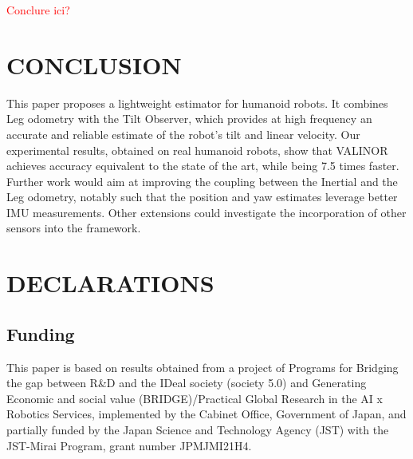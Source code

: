 \documentclass{IJCAS}
\begin{document}
\textcolor{red}{Conclure ici?}

\section{CONCLUSION}

This paper proposes a lightweight estimator for humanoid robots. It combines Leg odometry with the Tilt Observer, which provides at high frequency an accurate and reliable estimate of the robot's tilt and linear velocity. Our experimental results, obtained on real humanoid robots, show that VALINOR achieves accuracy equivalent to the state of the art, while being 7.5 times faster. Further work would aim at improving the coupling between the Inertial and the Leg odometry, notably such that the position and yaw estimates leverage better IMU measurements. Other extensions could investigate the incorporation of other sensors into the framework.



\section*{DECLARATIONS}
\subsection*{Funding }
This paper is based on results obtained from a project of Programs for Bridging the gap between R\&D and the IDeal society (society 5.0) and Generating Economic and social value (BRIDGE)/Practical Global Research in the AI x Robotics Services, implemented by the Cabinet Office, Government of Japan, and partially funded by the Japan Science and Technology Agency (JST) with the JST-Mirai Program, grant number JPMJMI21H4.


% 
% 




\end{document}
